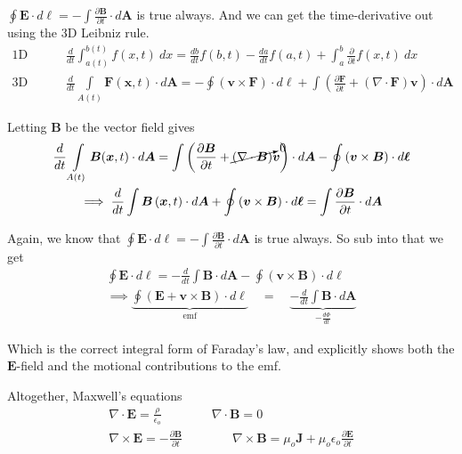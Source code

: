 \documentclass{article}
\numberwithin{equation}{section}
\begin{document}
$\displaystyle \oint \bm{E} \cdot d\bm{\ell} = -\int \frac{\partial \bm{B}}{\partial t} \cdot d\bm{A}$ is true always. And we can get the time-derivative out using the 3D Leibniz rule.
\begin{align*}
    \text{1D Leibniz Rule: }& \frac{d}{dt} \int_{a(t)}^{b(t)} f(x,t)\ dx = \frac{db}{dt} f(b,t) - \frac{da}{dt} f(a,t) + \int_a^b \frac{\partial}{\partial t} f(x, t)\ dx \\
    \text{3D Leibniz Rule: }& \frac{d}{dt} \int\limits_{A(t)} \bm{F}(\bm{x}, t) \cdot d\bm{A} = -\oint \left( \bm{v} \times \bm{F} \right) \cdot d\bm{\ell} + \int \left( \frac{\partial \bm{F}}{\partial t} + \left( \nabla \cdot \bm{F} \right) \bm{v} \right) \cdot d\bm{A}
\end{align*}

Letting $\bm{B}$ be the vector field gives
\begin{gather*}
    \frac{d}{dt} \int\limits_{A(t)} \bm{B}(\bm{x}, t) \cdot d\bm{A} = \int \left( \frac{\partial \bm{B}}{\partial t} + \cancelto{0}{\left( \nabla \cdot \bm{B} \right)} \bm{v} \right) \cdot d\bm{A} - \oint \left( \bm{v} \times \bm{B} \right) \cdot d\bm{\ell} \\
    \implies \frac{d}{dt} \int \bm{B} \left( \bm{x}, t \right) \cdot d\bm{A} + \oint \left( \bm{v} \times \bm{B} \right) \cdot d\bm{\ell} = \int \frac{\partial \bm{B}}{\partial t} \cdot d\bm{A}
\end{gather*}

Again, we know that $\displaystyle \oint \bm{E} \cdot d\bm{\ell} = -\int \frac{\partial \bm{B}}{\partial t} \cdot d\bm{A}$ is true always. So sub into that we get
\begin{gather*}
    \oint \bm{E} \cdot d\bm{\ell} = -\frac{d}{dt} \int \bm{B} \cdot d\bm{A} - \oint \left( \bm{v} \times \bm{B} \right) \cdot d\bm{\ell} \\
    \implies \underbrace{\oint \left( \bm{E} + \bm{v} \times \bm{B} \right) \cdot d\bm{\ell}}_{\displaystyle \text{emf}} \quad = \quad \underbrace{-\frac{d}{dt} \int \bm{B} \cdot d\bm{A}}_{\displaystyle -\frac{d\Phi}{dt}}
\end{gather*}

Which is the correct integral form of Faraday's law, and explicitly shows both the $\bm{E}$-field and the motional contributions to the emf.

Altogether, Maxwell's equations
\begin{gather*}
    \nabla \cdot \bm{E} = \frac{\rho}{\epsilon_o} \qquad\qquad \nabla \cdot \bm{B} = 0 \\
    \nabla \times \bm{E} = -\frac{\partial \bm{B}}{\partial t} \qquad\qquad \nabla \times \bm{B} = \mu_o \bm{J} + \mu_o\epsilon_o \frac{\partial \bm{E}}{\partial t}
\end{gather*}
\end{document}
